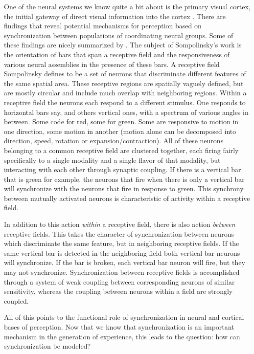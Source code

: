 \documentclass[12pt]{article}
\begin{document}
One of the neural systems we know quite a bit about is the primary visual cortex, the initial gateway of direct visual information into the cortex \cite{Tanaka}.  There are findings that reveal potential mechanisms for perception based on synchronization between populations of coordinating neural groups.  Some of these findings are nicely summarized by \cite{Sompolinsky}.  The subject of Sompolinsky's work is the orientation of bars that span a receptive field and the responsiveness of various neural assemblies in the presence of these bars.  A receptive field Sompolinsky defines to be a set of neurons that discriminate different features of the same spatial area.  These receptive regions are spatially vaguely defined, but are mostly circular and include much overlap with neighboring regions.  Within a receptive field the neurons each respond to a different stimulus.  One responds to horizontal bars say, and others vertical ones, with a spectrum of various angles in between.  Some code for red, some for green.  Some are responsive to motion in one direction, some motion in another (motion alone can be decomposed into direction, speed, rotation or expansion/contraction).  All of these neurons belonging to a common receptive field are clustered together, each firing fairly specifically to a single modality and a single flavor of that modality, but interacting with each other through synaptic coupling.  If there is a vertical bar that is green for example, the neurons that fire when there is only a vertical bar will synchronize with the neurons that fire in response to green.  This synchrony between mutually activated neurons is characteristic of activity within a receptive field.  

In addition to this action {\em within} a receptive field, there is also action {\em between} receptive fields.  This takes the character of synchronization between neurons which discriminate the same feature, but in neighboring receptive fields.  If the same vertical bar is detected in the neighboring field both vertical bar neurons will synchronize.  If the bar is broken, each vertical bar neuron will fire, but they may not synchronize.  Synchronization between receptive fields is accomplished through a system of weak coupling between corresponding neurons of similar sensitivity, whereas the coupling between neurons within a field are strongly coupled.  

All of this points to the functional role of synchronization in neural and cortical bases of perception.  Now that we know that synchronization is an important mechanism in the generation of experience, this leads to the question: how can synchronization be modeled?
\end{document}
